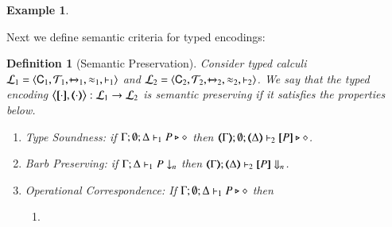 \documentclass[preprint,11pt]{elsarticle}
\newtheorem{definition}{Definition}[section]
\newtheorem{example}{Example}[section]
\begin{document}
{\begin{example}
\end{example}

Next we define semantic criteria for typed encodings:


\begin{definition}[Semantic Preservation]%
\label{def:ep}
       Consider typed calculi %
        $\mathcal{L}_1=\langle \mathsf{C}_1, {\cal{T}}_1, \xmapsto{~}_1, \approx_1, \vdash_1 \rangle$
       and $\mathcal{L}_2=\langle \mathsf{C}_2, {\cal{T}}_2, \xmapsto{~}_2, \approx_2, \vdash_2 \rangle$.
We say that the typed encoding $\enco{\map{\cdot}, \mapt{\cdot}}: \tyl{L}_1 \to \tyl{L}_2$ is \emph{semantic preserving}
if it satisfies the properties below.
	
	\begin{enumerate}[1.]
		\item \emph{Type Soundness}:
	if
	$\Gamma; \emptyset; \Delta \vdash_1 P \triangleright \diamond$ then 
	$\mapt{\Gamma}; \emptyset; \mapt{\Delta} \proves_2 \map{P} \hastype \Proc$.

			\item \emph{Barb Preserving}: if $\Gamma; \Delta \vdash_1 P \downarrow_{n}$
		then $\mapt{\Gamma}; \mapt{\Delta} \proves_2 \map{P} \Barb{n}$.

	\item \emph{Operational Correspondence}: If $\Gamma; \emptyset; \Delta \vdash_1 P \triangleright \diamond$ then
		\begin{enumerate}
			\item	{}
				

\end{enumerate}
\end{enumerate}
\end{definition}}
\end{document}
